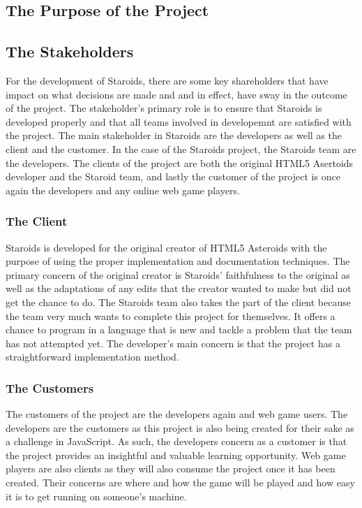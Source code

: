 \documentclass[12pt, titlepage]{article}
\begin{document}
\subsection{The Purpose of the Project}

\subsection{The Stakeholders}
For the development of Staroids, there are some key shareholders that have impact on what decisions are made and and in effect, have sway in the outcome of the project. The stakeholder's primary role is to ensure that Staroids is developed properly and that all teams involved in developemnt are satisfied with the project. The main stakeholder in Staroids are the developers as well as the client and the customer. In the case of the Staroids project, the Staroids team are the developers. The clients of the project are both the original HTML5 Asertoids developer and the Staroid team, and lastly the customer of the project is once again the developers and any online web game players.\\

\subsubsection{The Client}
Staroids is developed for the original creator of HTML5 Asteroids with the purpose of using the proper implementation and documentation techniques. The primary concern of the original creator is Staroids' faithfulness to the original as well as the adaptations of any edits that the creator wanted to make but did not get the chance to do. The Staroids team also takes the part of the client because the team very much wants to complete this project for themselves. It offers a chance to program in a language that is new and tackle a problem that the team has not attempted yet. The developer's main concern is that the project has a straightforward implementation method.\\

\subsubsection{The Customers}
The customers of the project are the developers again and web game users. The developers are the customers as this project is also being created for their sake as a challenge in JavaScript. As such, the developers concern as a customer is that the project provides an insightful and valuable learning opportunity. Web game players are also clients as they will also consume the project once it has been created. Their concerns are where and how the game will be played and how easy it is to get running on someone's machine.\\
\end{document}
